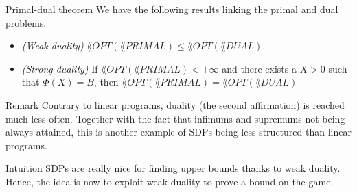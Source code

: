 \documentclass[a4paper]{article}
\begin{document}
\begin{parag}{Primal-dual theorem}
    We have the following results linking the primal and dual problems.
    \begin{itemize}
        \item \textit{(Weak duality)} $\lang{OPT}\left(\lang{PRIMAL}\right) \leq \lang{OPT}\left(\lang{DUAL}\right)$.
        \item \textit{(Strong duality)} If $\lang{OPT}\left(\lang{PRIMAL}\right) < +\infty$ and there exists a $X > 0$ such that $\Phi\left(X\right) = B$, then $\lang{OPT}\left(\lang{PRIMAL}\right) = \lang{OPT}\left(\lang{DUAL}\right)$
    \end{itemize}

    \begin{subparag}{Remark}
        Contrary to linear programs, duality (the second affirmation) is reached much less often. Together with the fact that infimums and supremums not being always attained, this is another example of SDPs being less structured than linear programs.
    \end{subparag}

    \begin{subparag}{Intuition}
        SDPs are really nice for finding upper bounds thanks to weak duality. Hence, the idea is now to exploit weak duality to prove a bound on the  game. 
    \end{subparag}
\end{parag}
\end{document}
